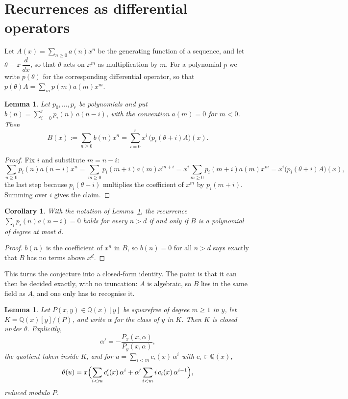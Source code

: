 \documentclass[11pt,a4paper]{article}
\theoremstyle{plain}
\newtheorem{lemma}[theorem]{Lemma}
\newtheorem{corollary}[theorem]{Corollary}
\theoremstyle{definition}
\begin{document}
\section{Recurrences as differential operators}

Let $A(x)=\sum_{n\ge0}a(n)x^{n}$ be the generating function of a sequence, and let
$\theta=x\,\dfrac{d}{dx}$, so that $\theta$ acts on $x^{m}$ as multiplication by $m$. For a
polynomial $p$ we write $p(\theta)$ for the corresponding differential operator, so that
$p(\theta)A=\sum_{m}p(m)a(m)x^{m}$.

\begin{lemma}\label{lem:transfer}
Let $p_{0},\dots,p_{r}$ be polynomials and put $b(n)=\sum_{i=0}^{r}p_{i}(n)\,a(n-i)$, with
the convention $a(m)=0$ for $m<0$. Then
\[
B(x):=\sum_{n\ge0}b(n)x^{n}=\sum_{i=0}^{r}x^{i}\,\bigl(p_{i}(\theta+i)A\bigr)(x).
\]
\end{lemma}

\begin{proof}
Fix $i$ and substitute $m=n-i$:
\[
\sum_{n\ge0}p_{i}(n)a(n-i)x^{n}=\sum_{m\ge0}p_{i}(m+i)a(m)x^{m+i}
=x^{i}\sum_{m\ge0}p_{i}(m+i)a(m)x^{m}=x^{i}\bigl(p_{i}(\theta+i)A\bigr)(x),
\]
the last step because $p_{i}(\theta+i)$ multiplies the coefficient of $x^{m}$ by
$p_{i}(m+i)$. Summing over $i$ gives the claim.
\end{proof}

\begin{corollary}\label{cor:criterion}
With the notation of Lemma~\ref{lem:transfer}, the recurrence
$\sum_{i}p_{i}(n)a(n-i)=0$ holds for every $n>d$ if and only if $B$ is a polynomial of
degree at most $d$.
\end{corollary}

\begin{proof}
$b(n)$ is the coefficient of $x^{n}$ in $B$, so $b(n)=0$ for all $n>d$ says exactly that
$B$ has no terms above $x^{d}$.
\end{proof}

This turns the conjecture into a closed-form identity. The point is that it can then be
decided exactly, with no truncation: $A$ is algebraic, so $B$ lies in the same field as
$A$, and one only has to recognise it.

\begin{lemma}\label{lem:field}
Let $P(x,y)\in\mathbb{Q}(x)[y]$ be squarefree of degree $m\ge1$ in $y$, let
$K=\mathbb{Q}(x)[y]/(P)$, and write $\alpha$ for the class of $y$ in $K$. Then $K$ is
closed under $\theta$. Explicitly,
\[
\alpha'=-\frac{P_{x}(x,\alpha)}{P_{y}(x,\alpha)},
\]
the quotient taken inside $K$, and for $u=\sum_{i<m}c_{i}(x)\,\alpha^{i}$ with
$c_{i}\in\mathbb{Q}(x)$,
\[
\theta(u)=x\Bigl(\sum_{i<m}c_{i}'(x)\,\alpha^{i}
 +\alpha'\sum_{i<m}i\,c_{i}(x)\,\alpha^{i-1}\Bigr),
\]
reduced modulo $P$.
\end{lemma}
\end{document}
